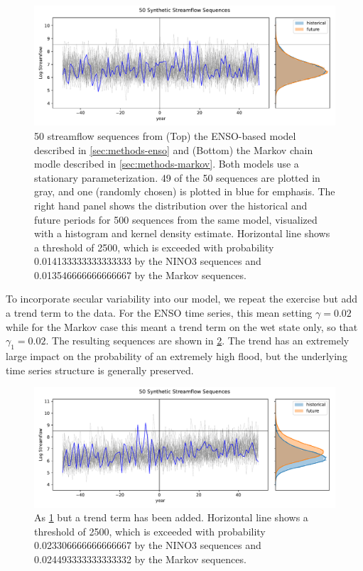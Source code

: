 \documentclass[12pt]{article}
\begin{document}
\begin{figure}[b]
  \includegraphics[width=\textwidth]{stationary_sequences.pdf}  
  \caption{
    50 streamflow sequences from (Top) the ENSO-based model described in \cref{sec:methods-enso} and (Bottom) the Markov chain modle described in \cref{sec:methods-markov}.
    Both models use a stationary parameterization.
    49 of the 50 sequences are plotted in gray, and one (randomly chosen) is plotted in blue for emphasis.
    The right hand panel shows the distribution over the historical and future periods for 500 sequences from the same model, visualized with a histogram and kernel density estimate.
    Horizontal line shows a threshold of \num{2500}, which is exceeded with probability \num{0.014133333333333333} by the NINO3 sequences and \num{0.013546666666666667} by the Markov sequences.\label{fig:stationary-sequences}
  }
\end{figure}

To incorporate secular variability into our model, we repeat the exercise but add a trend term to the data.
For the ENSO time series, this mean setting \(\gamma=0.02\) while for the Markov case this meant a trend term on the wet state only, so that \(\gamma_1=0.02\).
The resulting sequences are shown in \cref{fig:trend-sequences}.
The trend has an extremely large impact on the probability of an extremely high flood, but the underlying time series structure is generally preserved.
\begin{figure}[b]
  \includegraphics[width=\textwidth]{trend_sequences.pdf}
  \caption{
    As \cref{fig:stationary-sequences} but a trend term has been added.
    Horizontal line shows a threshold of \num{2500}, which is exceeded with probability \num{0.023306666666666667} by the NINO3 sequences and \num{0.024493333333333332} by the Markov sequences.\label{fig:trend-sequences}
  }
\end{figure}
\end{document}
